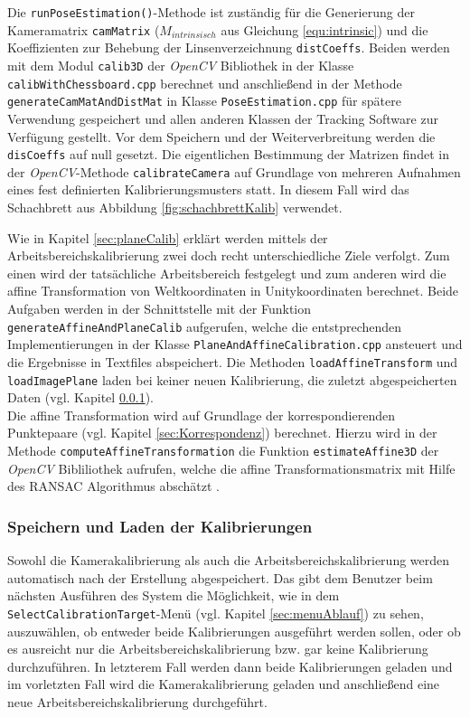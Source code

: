 Die \texttt{runPoseEstimation()}-Methode ist zuständig für die Generierung der Kameramatrix \texttt{camMatrix}  ($M_{intrinsisch}$ aus Gleichung \ref{equ:intrinsic})  und die Koeffizienten zur Behebung der Linsenverzeichnung \texttt{distCoeffs}. Beiden werden mit dem Modul \texttt{calib3D} der \textit{OpenCV} Bibliothek in der Klasse \texttt{calibWithChessboard.cpp} berechnet und anschließend in der Methode \texttt{generateCamMatAndDistMat} in Klasse \texttt{PoseEstimation.cpp} für spätere  Verwendung gespeichert und allen anderen Klassen der Tracking Software zur Verfügung gestellt. Vor dem Speichern und der Weiterverbreitung werden die \texttt{disCoeffs} auf null gesetzt. Die eigentlichen Bestimmung der Matrizen findet in der \textit{OpenCV}-Methode \texttt{calibrateCamera}  auf Grundlage von mehreren Aufnahmen eines fest definierten Kalibrierungsmusters statt. In diesem Fall wird das Schachbrett aus Abbildung \ref{fig:schachbrettKalib} verwendet. 

Wie in Kapitel \ref{sec:planeCalib} erklärt werden mittels der Arbeitsbereichskalibrierung zwei doch recht unterschiedliche Ziele verfolgt. Zum einen wird der tatsächliche Arbeitsbereich festgelegt und zum anderen wird die affine Transformation von Weltkoordinaten in Unitykoordinaten berechnet. Beide Aufgaben werden in der Schnittstelle mit der Funktion \texttt{generateAffineAndPlaneCalib} aufgerufen, welche die entstprechenden Implementierungen in der Klasse \texttt{PlaneAndAffineCalibration.cpp} ansteuert und die Ergebnisse in Textfiles abspeichert. Die Methoden \texttt{loadAffineTransform} und \texttt{loadImagePlane} laden bei keiner neuen Kalibrierung, die zuletzt abgespeicherten Daten (vgl. Kapitel \ref{sec:saveCalib}). \\

Die affine Transformation wird auf Grundlage der korrespondierenden Punktepaare (vgl. Kapitel \ref{sec:Korrespondenz}) berechnet. Hierzu wird in der Methode \texttt{computeAffineTransformation} die Funktion \texttt{estimateAffine3D} der \textit{OpenCV} Bibliliothek aufrufen, welche die affine Transformationsmatrix mit Hilfe des RANSAC Algorithmus abschätzt \cite{articel:RANSAC}.

\subsubsection{Speichern und Laden der Kalibrierungen}\label{sec:saveCalib}
Sowohl die Kamerakalibrierung als auch die Arbeitsbereichskalibrierung werden automatisch nach der Erstellung abgespeichert. Das gibt dem Benutzer beim nächsten Ausführen des System die Möglichkeit, wie in dem \texttt{SelectCalibrationTarget}-Menü (vgl. Kapitel \ref{sec:menuAblauf}) zu sehen, auszuwählen, ob entweder beide Kalibrierungen ausgeführt werden sollen, oder ob es ausreicht nur die Arbeitsbereichskalibrierung bzw. gar keine Kalibrierung durchzuführen. In letzterem Fall werden dann beide Kalibrierungen geladen und im vorletzten Fall wird die Kamerakalibrierung geladen und anschließend eine neue Arbeitsbereichskalibrierung durchgeführt. 


